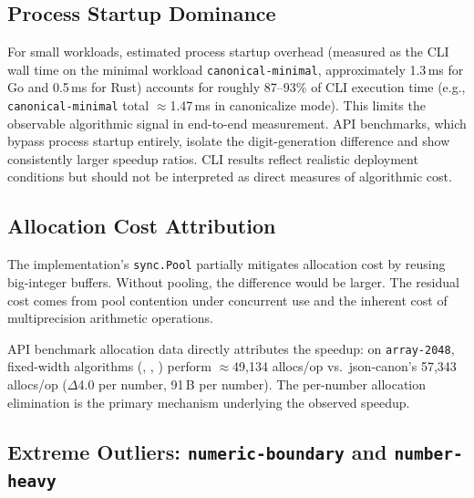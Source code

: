 

\subsection{Process Startup Dominance}

For small workloads, estimated process startup overhead (measured as
the CLI wall time on the minimal workload \texttt{canonical-minimal},
approximately 1.3\,ms for Go and 0.5\,ms for Rust) accounts for
roughly 87--93\% of CLI execution time (e.g.,
\texttt{canonical-minimal} total $\approx$1.47\,ms in canonicalize
mode).  This limits the observable
algorithmic signal in end-to-end measurement.  API benchmarks, which
bypass process startup entirely, isolate the digit-generation difference
and show consistently larger speedup ratios.  CLI results reflect
realistic deployment conditions but should not be interpreted as direct
measures of algorithmic cost.

\subsection{Allocation Cost Attribution}

The \burgerdybvig implementation's \texttt{sync.Pool} partially mitigates
allocation cost by reusing big-integer buffers.  Without pooling, the
difference would be larger.  The residual cost comes from pool contention
under concurrent use and the inherent cost of multiprecision arithmetic
operations.

API benchmark allocation data directly attributes the speedup:
on \texttt{array-2048}, fixed-width algorithms (\schubfach, \ryualg,
\dragonbox) perform ${\approx}$49{,}134 allocs/op vs.\
json-canon's 57{,}343 allocs/op ($\Delta$4.0 per number, 91\,B per
number).  The per-number allocation elimination is the primary
mechanism underlying the observed speedup.

\subsection{Extreme Outliers: \texttt{numeric-boundary} and \texttt{number-heavy}}



